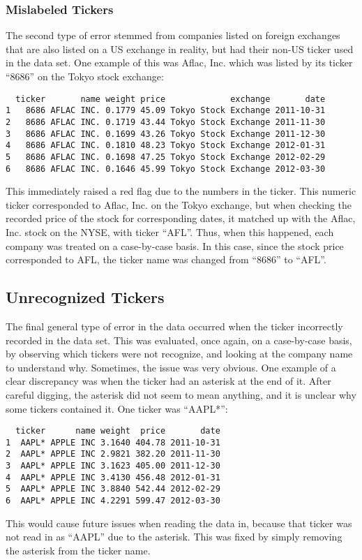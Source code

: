 \documentclass[12pt,twoside]{reedthesis}
\theoremstyle{definition}
\theoremstyle{definition}
\theoremstyle{definition}
\theoremstyle{remark}
\begin{document}
\subsubsection{Mislabeled Tickers}\label{mislabeled-tickers}

The second type of error stemmed from companies listed on foreign
exchanges that are also listed on a US exchange in reality, but had
their non-US ticker used in the data set. One example of this was Aflac,
Inc. which was listed by its ticker ``8686'' on the Tokyo stock
exchange:
\begin{verbatim}
  ticker       name weight price             exchange       date
1   8686 AFLAC INC. 0.1779 45.09 Tokyo Stock Exchange 2011-10-31
2   8686 AFLAC INC. 0.1719 43.44 Tokyo Stock Exchange 2011-11-30
3   8686 AFLAC INC. 0.1699 43.26 Tokyo Stock Exchange 2011-12-30
4   8686 AFLAC INC. 0.1810 48.23 Tokyo Stock Exchange 2012-01-31
5   8686 AFLAC INC. 0.1698 47.25 Tokyo Stock Exchange 2012-02-29
6   8686 AFLAC INC. 0.1646 45.99 Tokyo Stock Exchange 2012-03-30
\end{verbatim}
This immediately raised a red flag due to the numbers in the ticker.
This numeric ticker corresponded to Aflac, Inc. on the Tokyo exchange,
but when checking the recorded price of the stock for corresponding
dates, it matched up with the Aflac, Inc. stock on the NYSE, with ticker
``AFL''. Thus, when this happened, each company was treated on a
case-by-case basis. In this case, since the stock price corresponded to
AFL, the ticker name was changed from ``8686'' to ``AFL''.

\subsection{Unrecognized Tickers}\label{unrecognized-tickers}

The final general type of error in the data occurred when the ticker
incorrectly recorded in the data set. This was evaluated, once again, on
a case-by-case basis, by observing which tickers were not recognize, and
looking at the company name to understand why. Sometimes, the issue was
very obvious. One example of a clear discrepancy was when the ticker had
an asterisk at the end of it. After careful digging, the asterisk did
not seem to mean anything, and it is unclear why some tickers contained
it. One ticker was ``AAPL*'':
\begin{verbatim}
  ticker      name weight  price       date
1  AAPL* APPLE INC 3.1640 404.78 2011-10-31
2  AAPL* APPLE INC 2.9821 382.20 2011-11-30
3  AAPL* APPLE INC 3.1623 405.00 2011-12-30
4  AAPL* APPLE INC 3.4130 456.48 2012-01-31
5  AAPL* APPLE INC 3.8840 542.44 2012-02-29
6  AAPL* APPLE INC 4.2291 599.47 2012-03-30
\end{verbatim}
This would cause future issues when reading the data in, because that
ticker was not read in as ``AAPL'' due to the asterisk. This was fixed
by simply removing the asterisk from the ticker name.
\end{document}
